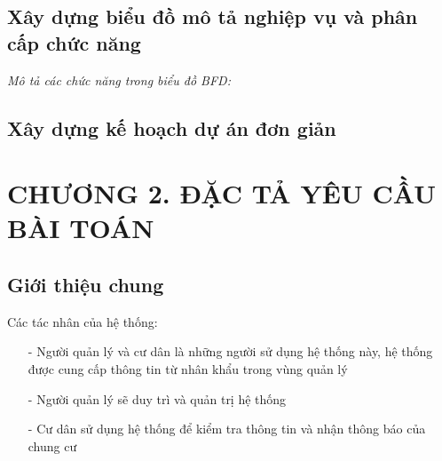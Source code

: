 \documentclass{article}
\begin{document}
\subsection{Xây dựng biểu đồ mô tả nghiệp vụ và phân cấp chức năng}

\newpage


\textit{Mô tả các chức năng trong biểu đồ BFD:}
\BFDInfo
\newpage

\subsection{Xây dựng kế hoạch dự án đơn giản}
\tableRiskManager
\newpage

\section*{CHƯƠNG 2. ĐẶC TẢ YÊU CẦU BÀI TOÁN}
\setcounter{section}{2}
\setcounter{subsection}{0}
\subsection{Giới thiệu chung}
Các tác nhân của hệ thống: 
\begin{itemize}
    \item[-] Người quản lý và cư dân là những người sử dụng hệ thống này, hệ thống được cung cấp thông tin từ nhân khẩu trong vùng quản lý
    \item[-] Người quản lý sẽ duy trì và quản trị hệ thống 
    \item[-] Cư dân sử dụng hệ thống để kiểm tra thông tin và nhận thông báo của chung cư
\end{itemize}
\end{document}
